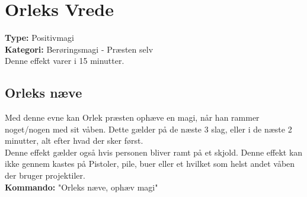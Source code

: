 \section{Orleks Vrede}
\textbf{Type:} Positivmagi\\
\textbf{Kategori:} Berøringsmagi - Præsten selv\\
Denne effekt varer i 15 minutter.\\

\subsection{Orleks næve}
Med denne evne kan Orlek præsten ophæve en magi, når han rammer noget/nogen med sit våben. Dette gælder på de næste 3 slag, eller i de næste 2 minutter, alt efter hvad der sker først.\\
Denne effekt gælder også hvis personen bliver ramt på et skjold. Denne effekt kan ikke gennem kastes på Pistoler, pile, buer eller et hvilket som helst andet våben der bruger projektiler.\\
\textbf{Kommando:} "Orleks næve, ophæv magi"\\
